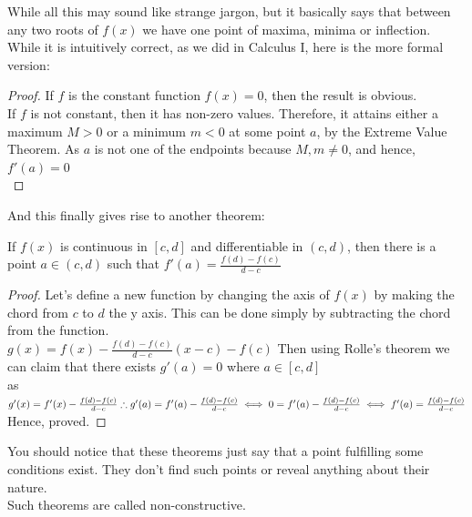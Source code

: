 While all this may sound like strange jargon, but it basically says that between any two roots of $f(x)$ we have one point of maxima, minima or inflection. While it is intuitively correct, as we did in Calculus I, here is the more formal version:\\
\begin{proof}
    If $f$ is the constant function $f(x) = 0$, then the result is obvious.\\
    If $f$ is not constant, then it has non-zero values. Therefore, it attains either a maximum $M > 0$ or a minimum $m < 0$ at some point $a$, by the Extreme Value Theorem. As $a$ is not one of the endpoints because $M,m \neq 0$, and hence, $f'(a)=0$\\
\end{proof}
And this finally gives rise to another theorem:\\
\begin{theorem}
    If $f(x)$ is continuous in $[c,d]$ and differentiable in $(c,d)$, then there is a point $a \in (c,d)$ such that $f'(a)=\frac{f(d)-f(c)}{d-c}$\\
\end{theorem}
\begin{proof}
    Let's define a new function by changing the axis of $f(x)$ by making the chord from $c$ to $d$ the y axis. This can be done simply by subtracting  the chord from the function.\\
    $g(x)=f(x)-\frac{f(d)-f(c)}{d-c}(x-c)-f(c)$
    Then using Rolle's theorem we can claim that there exists $g'(a)=0$ where $a \in [c,d]$\\
    as $g'(x)=f'(x)-\frac{f(d)-f(c)}{d-c}\\
    \therefore g'(a)=f'(a)-\frac{f(d)-f(c)}{d-c}\\
    \iff 0=f'(a)-\frac{f(d)-f(c)}{d-c}\\
    \iff f'(a)=\frac{f(d)-f(c)}{d-c}$\\
    Hence, proved.
\end{proof}
You should notice that these theorems just say that a point fulfilling some conditions exist. They don't find such points or reveal anything about their nature.\\
Such theorems are called non-constructive.\\
